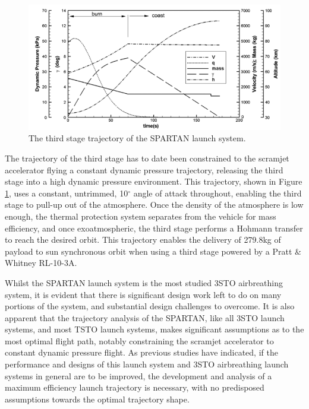  
 \begin{figure}[ht]
 	\centering
 	\includegraphics[width=0.9\linewidth]{figures/2_literature-review/SPARTAN_trajthirdstage}
 	\caption{The third stage trajectory of the SPARTAN launch system\cite{Preller2018a}.}
 	\label{fig:SPARTAN_trajthirdstage}
 \end{figure}

The trajectory of the third stage has to date been constrained to the scramjet accelerator flying a constant dynamic pressure trajectory, releasing the third stage into a high dynamic pressure environment. This trajectory, shown in Figure \ref{fig:SPARTAN_trajthirdstage}, uses a constant, untrimmed, 10$^\circ$ angle of attack throughout, enabling the third stage to pull-up out of the atmosphere.  
 Once the density of the atmosphere is low enough, the thermal protection system separates from the vehicle for mass efficiency, and once exoatmospheric, the third stage performs a Hohmann transfer to reach the desired orbit. 
This trajectory enables the delivery of 279.8kg\cite{Preller2018a} of payload to sun synchronous orbit when using a third stage powered by a Pratt \& Whitney RL-10-3A\cite{Preller2018a}. 

Whilst the SPARTAN launch system is the most studied 3STO airbreathing system, it is evident that there is significant design work left to do on many portions of the system, and substantial design challenges to overcome. It is also apparent that the trajectory analysis of the SPARTAN, like all 3STO launch systems, and most TSTO launch systems, makes significant assumptions as to the most optimal flight path, notably constraining the scramjet accelerator to constant dynamic pressure flight. 
As previous studies have indicated\cite{Preller2017b}, if the performance and designs of this launch system and 3STO airbreathing launch systems in general are to be improved, the development and analysis of a maximum efficiency launch trajectory is necessary, with no predisposed assumptions towards the optimal trajectory shape.

